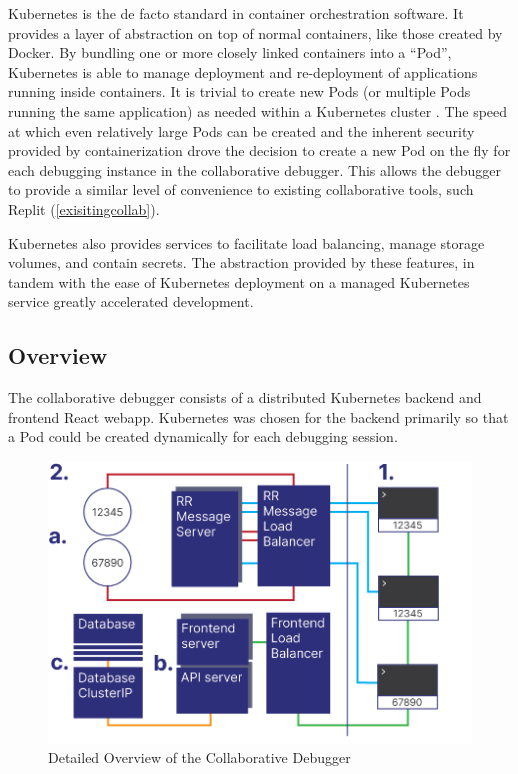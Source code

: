 \documentclass[12pt]{article}
\begin{document}
Kubernetes is the de facto standard in container orchestration
software.  It provides a layer of abstraction on top of normal
containers, like those created by Docker.  By bundling one or more
closely linked containers into a ``Pod'', Kubernetes is able to manage
deployment and re-deployment of applications running inside
containers.  It is trivial to create new Pods (or multiple Pods
running the same application) as needed within a Kubernetes cluster
\cite{k8s}.  The speed at which even relatively large Pods can be
created and the inherent security provided by containerization drove
the decision to create a new Pod on the fly for each debugging
instance in the collaborative debugger.  This allows the debugger to
provide a similar level of convenience to existing collaborative
tools, such Replit (\ref{exisitingcollab}).
\par

Kubernetes also provides services to facilitate load balancing, manage
storage volumes, and contain secrets.  The abstraction provided by
these features, in tandem with the ease of Kubernetes deployment on a
managed Kubernetes service\cite{do_managed_k8s} greatly accelerated
development.

\subsection{Overview}

The collaborative debugger consists of a distributed Kubernetes
backend and frontend React webapp.  Kubernetes was chosen for the
backend primarily so that a Pod could be created dynamically for each
debugging session. \pagebreak

\begin{figure}[h!]

  \includegraphics[scale=.9]{detailed_system}
  \centering
  \caption{Detailed Overview of the Collaborative Debugger}
  \label{debugger:detailedoverview}
\end{figure}
\end{document}
